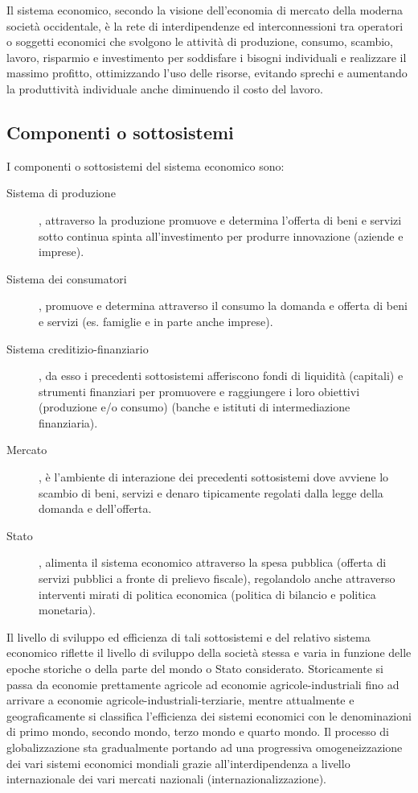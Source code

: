 Il sistema economico, secondo la visione dell'economia di mercato della 
moderna società occidentale, è la rete di interdipendenze ed interconnessioni 
tra operatori o soggetti economici che svolgono le attività di produzione, 
consumo, scambio, lavoro, risparmio e investimento per soddisfare i bisogni 
individuali e realizzare il massimo profitto, ottimizzando l'uso delle risorse, 
evitando sprechi e aumentando la produttività individuale anche diminuendo il 
costo del lavoro.

\subsection{Componenti o sottosistemi}

I componenti o sottosistemi del sistema economico sono:

\begin{description}
 \item [Sistema di produzione], attraverso la produzione promuove e 
determina l'offerta di beni e servizi sotto 
continua spinta all'investimento per produrre innovazione 
(aziende e imprese).
 \item [Sistema dei consumatori], promuove e determina 
attraverso il consumo la domanda e offerta di beni e 
servizi (es. famiglie e in parte anche imprese).
 \item [Sistema creditizio-finanziario], da esso i 
precedenti sottosistemi afferiscono fondi di liquidità (capitali) e 
strumenti finanziari per 
promuovere e raggiungere i loro obiettivi (produzione e/o consumo) 
(banche e istituti di intermediazione finanziaria).
 \item [Mercato], è l'ambiente di interazione dei precedenti sottosistemi 
dove avviene lo scambio di beni, servizi e denaro tipicamente regolati 
dalla legge della domanda e dell'offerta.
 \item [Stato], alimenta il sistema economico attraverso la spesa 
pubblica (offerta di servizi pubblici a fronte di prelievo fiscale), 
regolandolo anche attraverso interventi mirati di politica economica 
(politica di bilancio e politica monetaria).
\end{description}

Il livello di sviluppo ed efficienza di tali sottosistemi e del relativo 
sistema economico riflette il livello di sviluppo della società stessa e varia 
in funzione delle epoche storiche o della parte del mondo o Stato considerato. 
Storicamente si passa da economie prettamente agricole ad economie 
agricole-industriali fino ad arrivare a economie 
agricole-industriali-terziarie, mentre attualmente e geograficamente si 
classifica l'efficienza dei sistemi economici con le denominazioni di primo 
mondo, secondo mondo, terzo mondo e quarto mondo. Il processo di 
globalizzazione sta gradualmente portando ad una progressiva 
omogeneizzazione dei vari sistemi economici mondiali grazie all'interdipendenza 
a livello internazionale dei vari mercati nazionali (internazionalizzazione).

